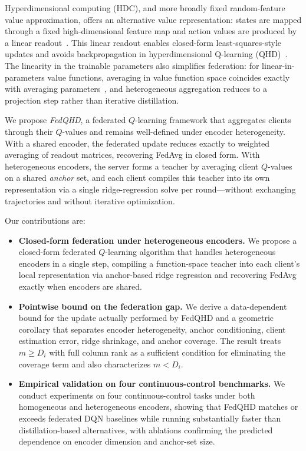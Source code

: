 \documentclass[sigconf,anonymous]{aamas}
\theoremstyle{plain}
\theoremstyle{definition}
\theoremstyle{remark}
\begin{document}
Hyperdimensional computing (HDC), and more broadly fixed random-feature value approximation, offers an alternative value representation: states are mapped through a fixed high-dimensional feature map and action values are produced by a linear readout~\citep{kanerva2009hyperdimensional}. This linear readout enables closed-form least-squares-style updates and avoids backpropagation in hyperdimensional Q-learning (QHD)~\citep{ni2022qhd}. The linearity in the trainable parameters also simplifies federation: for linear-in-parameters value functions, averaging in value function space coincides exactly with averaging parameters~\citep{lagoudakis2003least, bhandari2018finite}, and heterogeneous aggregation reduces to a projection step rather than iterative distillation.


We propose \emph{FedQHD}, a federated $Q$-learning framework that aggregates clients through their $Q$-values and remains well-defined under encoder heterogeneity. With a shared encoder, the federated update reduces exactly to weighted averaging of readout matrices, recovering FedAvg in closed form. With heterogeneous encoders, the server forms a teacher by averaging client $Q$-values on a shared \emph{anchor} set, and each client compiles this teacher into its own representation via a single ridge-regression solve per round---without exchanging trajectories and without iterative optimization.

Our contributions are:
\begin{itemize}
    \item \textbf{Closed-form federation under heterogeneous encoders.} We propose a closed-form federated $Q$-learning algorithm that handles heterogeneous encoders in a single step, compiling a function-space teacher into each client's local representation via anchor-based ridge regression and recovering FedAvg exactly when encoders are shared.
    \item \textbf{Pointwise bound on the federation gap.} We derive a data-dependent bound for the update actually performed by FedQHD and a geometric corollary that separates encoder heterogeneity, anchor conditioning, client estimation error, ridge shrinkage, and anchor coverage. The result treats $m\geq D_i$ with full column rank as a sufficient condition for eliminating the coverage term and also characterizes $m<D_i$.
    \item \textbf{Empirical validation on four continuous-control benchmarks.} We conduct experiments on four continuous-control tasks under both homogeneous and heterogeneous encoders, showing that FedQHD matches or exceeds federated DQN baselines while running substantially faster than distillation-based alternatives, with ablations confirming the predicted dependence on encoder dimension and anchor-set size.
\end{itemize}
\end{document}
